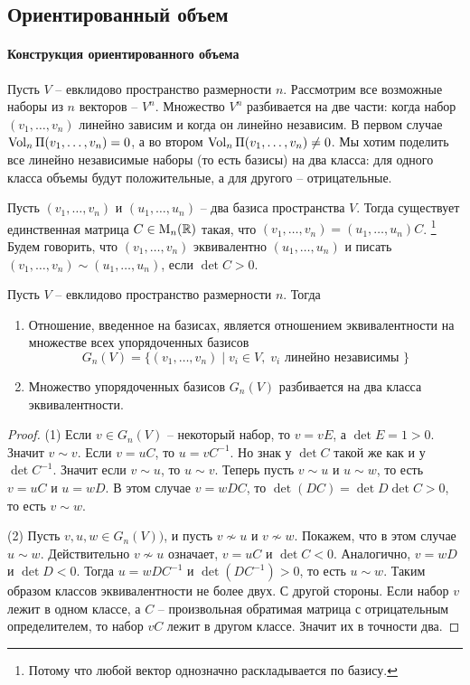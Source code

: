 \subsection{Ориентированный объем}

\paragraph{Конструкция ориентированного объема}

Пусть $V$ -- евклидово пространство размерности $n$.
Рассмотрим все возможные наборы из $n$ векторов -- $V^n$.
Множество $V^n$ разбивается на две части: когда набор $(v_1,\ldots,v_n)$ линейно зависим и когда он линейно независим.
В первом случае $\operatorname{Vol}_n\Pi(v_1,\ldots,v_n) = 0$, а во втором $\operatorname{Vol}_n\Pi(v_1,\ldots,v_n)\neq 0$.
Мы хотим поделить все линейно независимые наборы (то есть базисы) на два класса: для одного класса объемы будут положительные, а для другого -- отрицательные.

\begin{definition}
Пусть $(v_1,\ldots,v_n)$ и $(u_1,\ldots,u_n)$ -- два базиса пространства $V$.
Тогда существует единственная матрица $C\in \operatorname{M}_{n}(\mathbb R)$ такая, что $(v_1,\ldots,v_n) = (u_1,\ldots,u_n)C$.%
\footnote{Потому что любой вектор однозначно раскладывается по базису.}
Будем говорить, что $(v_1,\ldots,v_n)$ эквивалентно $(u_1,\ldots,u_n)$ и писать $(v_1,\ldots,v_n)\sim(u_1,\ldots,u_n)$, если $\det C > 0$.
\end{definition}

\begin{claim}
Пусть $V$ -- евклидово пространство размерности $n$.
Тогда
\begin{enumerate}
\item Отношение, введенное на базисах, является отношением эквивалентности на множестве всех упорядоченных базисов
\[
G_n(V) = \{(v_1,\ldots,v_n)\mid v_i\in V,\;v_i\text{ линейно независимы }\}
\]

\item Множество упорядоченных базисов $G_n(V)$ разбивается на два класса эквивалентности.
\end{enumerate}
\end{claim}
\begin{proof}
(1) Если $v \in G_n(V)$ -- некоторый набор, то $v = v E$, а $\det E = 1 > 0$.
Значит $v \sim v$.
Если $v = u C$, то $u = vC^{-1}$.
Но знак у $\det C$ такой же как и у $\det C^{-1}$.
Значит если $v \sim u$, то $u\sim v$.
Теперь пусть $v\sim u$ и $u\sim w$, то есть $v=  u C$ и $u = w D$.
В этом случае $v = wDC$, то $\det (DC) =\det D \det C >0$, то есть $v\sim w$.

(2) Пусть $v,u, w\in G_n(V))$, и пусть $v\not\sim u$ и $v\not\sim w$.
Покажем, что в этом случае $u \sim w$.
Действительно $v\not\sim u$ означает, $v = u C$ и $\det C < 0$.
Аналогично, $v = w D$ и $\det D < 0$.
Тогда $u = w DC^{-1}$ и $\det(DC^{-1}) > 0$, то есть $u\sim w$.
Таким образом классов эквивалентности не более двух.
С другой стороны.
Если набор $v$ лежит в одном классе, а $C$ -- произвольная обратимая матрица с отрицательным определителем, то набор $v C$ лежит в другом классе.
Значит их в точности два.
\end{proof}

